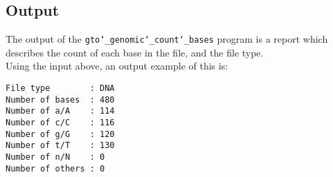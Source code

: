 \subsection*{Output}
The output of the \texttt{gto\char`_genomic\char`_count\char`_bases} program is a report which describes the count of each base in the file, and the file type.\\
Using the input above, an output example of this is:
\begin{lstlisting}
File type        : DNA
Number of bases  : 480
Number of a/A    : 114
Number of c/C    : 116
Number of g/G    : 120
Number of t/T    : 130
Number of n/N    : 0
Number of others : 0
\end{lstlisting}